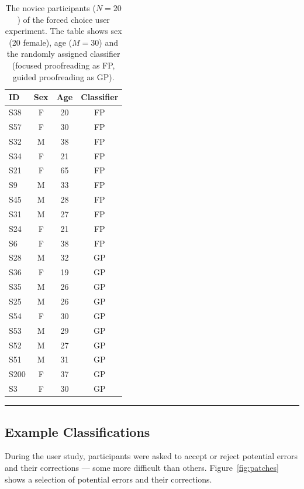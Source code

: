 \begin{table}[t]
\caption{The novice participants ($N=20$) of the forced choice user experiment. The table shows sex (20 female), age ($M=30$) and the randomly assigned classifier (focused proofreading as FP, guided proofreading as GP).}%

\small{
\begin{tabular}{@{}l|c|c|c@{}}
	\toprule
     \textbf{ID} & \textbf{Sex} &  \textbf{Age} & \textbf{Classifier}  \\ \midrule	
S38 &		F & 20 & FP \\
S57&		F & 30 & FP \\ 
S32&		M & 38 & FP \\
S34&		F & 21 & FP \\
S21&		F & 65 & FP \\
S9 &	M & 33 & FP \\
S45 &		M & 28 & FP \\
S31&		M & 27 & FP \\
S24&		F & 21 & FP \\
S6	&	F & 38 & FP \\
S28	&	M&	32& GP \\
S36	&	F&	19& GP \\
S35	&	M&	26& GP \\
S25	&	M&	26& GP \\
S54	&	F&	30& GP \\
S53	&	M&	29& GP \\
S52	&	M	&27& GP \\
S51&		M&	31& GP \\
S200	 &	F	&37& GP \\
S3	 &F&	30 & GP



\end{tabular}
\hspace{2mm}
\hrule
}
\label{tab:participants}
\end{table}

\subsection{Example Classifications}

During the user study, participants were asked to accept or reject potential errors and their corrections --- some more difficult than others. Figure~\ref{fig:patches} shows a selection of potential errors and their corrections.

